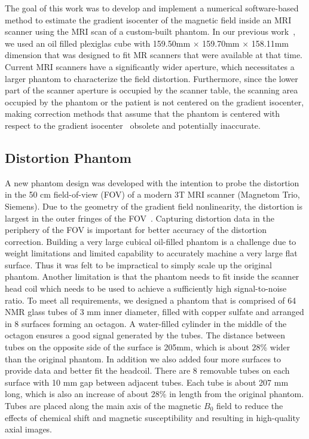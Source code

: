 The goal of this work was to develop and implement a numerical software-based method to estimate the gradient isocenter of the magnetic field inside an MRI scanner using the MRI scan of a custom-built phantom.  In our previous work~\cite{LSS06a,LSS06b,LSS08a,LSS08b}, we used an oil filled plexiglas cube with
159.50mm $\times$ 159.70mm $\times$ 158.11mm dimension that was designed to fit MR scanners that were available at that time.  Current MRI scanners have a significantly wider aperture, which necessitates a larger phantom to characterize the field distortion.  Furthermore, since the lower part of the scanner aperture is occupied by the scanner table, the scanning area occupied by the phantom or the patient is not centered on the gradient isocenter, making correction methods that assume that the phantom is centered with respect to the gradient isocenter~\cite{LSS06a,LSS06b,LSS08a,LSS08b,Lang99} obsolete and potentially inaccurate.

\subsection{Distortion Phantom}
A new phantom design was developed with the intention to probe the distortion in the 50 cm field-of-view (FOV) of a modern 3T MRI scanner (Magnetom Trio, Siemens).  Due to the geometry of the gradient field nonlinearity, the distortion is largest in the outer fringes of the FOV~\cite{LSS06a,LSS06b,LSS08a,LSS08b}. Capturing distortion data in the periphery of the FOV is important for better accuracy of the distortion correction. Building a very large cubical oil-filled phantom is a challenge due to weight limitations and limited capability to accurately machine a very large flat surface. Thus it was felt to be impractical to simply scale up the original phantom.  Another limitation is that the phantom needs to fit inside the scanner head coil which needs to be used to achieve a sufficiently high signal-to-noise ratio.  To meet all requirements, we designed a phantom that is comprised of 64 NMR glass tubes of 3 mm inner diameter, filled with copper sulfate and arranged in 8 surfaces forming an octagon.  A water-filled cylinder in the middle of the octagon ensures a good signal generated by the tubes.  The distance between tubes on the opposite side of the surface is 205mm, which is about 28\% wider than the original phantom. In addition we also added four more surfaces to provide data and better fit the headcoil.  There are 8 removable tubes on each surface with 10 mm gap between adjacent tubes.  Each tube is about 207 mm long, which is also an increase of about 28\% in length from the original phantom.  Tubes are placed along the main axis of the magnetic $B_0$  field to reduce the effects of chemical shift and magnetic susceptibility and
resulting in high-quality axial images.

